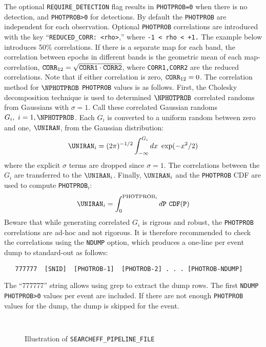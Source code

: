 \documentclass[12pt]{article}
\newcommand{\obs}{observation}
\begin{document}
{The optional {\tt REQUIRE\_DETECTION} flag results in {\tt PHOTPROB=0}
when there is no detection, and {\tt PHOTPROB>0} for detections.
By default the {\tt PHOTPROB} are independent for each \obs.
Optional {\tt PHOTPROB} correlations are introduced with the key
``{\tt REDUCED\_CORR: <rho>},'' where {\tt -1~<~rho~<~+1.}
The example below introduces 50\% correlations.
If there is a separate map for each band, the correlation
between epochs in different bands is the geometric mean of each
map-correlation, 
${\tt CORR}_{12} =\sqrt{{\tt CORR1}\cdot{\tt CORR2}}$, 
where {\tt CORR1,CORR2} are the reduced correlations.
Note that if either correlation is zero, ${\tt CORR}_{12}=0$.
The correlation method for $\NPHOTPROB$ {\tt PHOTPROB} 
values is as follows. 
First, the Cholesky decomposition technique is used to determined
$\NPHOTPROB$ correlated randoms from Gaussians with $\sigma=1$.
Call these correlated Gaussian randoms $G_i,~i=1,\NPHOTPROB$.
Each $G_i$ is converted to a uniform random between
zero and one, $\UNIRAN$, from the Gaussian distribution:
\begin{equation}
  \UNIRAN_i = (2\pi)^{-1/2} \int_{-\infty}^{G_i} dx~\exp(-x^2/2)
\end{equation}
where the explicit $\sigma$ terms are dropped since $\sigma=1$.
The correlations between the $G_i$ are transferred to the $\UNIRAN_i$.
Finally, $\UNIRAN_i$ and the {\tt PHOTPROB} CDF are used
to compute {\tt PHOTPROB}$_i$:
\begin{equation}
   \UNIRAN_i = \int_0^{{\tt\rm PHOTPROB}_i} d{\tt P}~{\tt CDF(P)}
\end{equation}
%
Beware that while generating correlated $G_i$ is rigrous and robust,
the {\tt PHOTPROB} correlations are ad-hoc and not rigorous.
It is therefore recommended to check the correlations using the
{\tt NDUMP} option,
which produces a one-line per event dump to standard-out as follows:
\begin{verbatim}
   777777  [SNID]  [PHOTROB-1]  [PHOTROB-2] . . . [PHOTROB-NDUMP]
\end{verbatim}
%
The ``777777'' string allows using grep to extract the dump rows.
The first {\tt NDUMP} {\tt PHOTPROB>0} values per event are included.
If there are not enough {\tt PHOTPROB} values for the dump, 
the dump is skipped for the event. 

\begin{figure}[hb] 
\begin{center}
\caption{Illustration of {\tt SEARCHEFF\_PIPELINE\_FILE} }
\label{fig:pipeline_maps}
\begin{Verbatim}[frame=single]


\end{Verbatim}
\end{center}
\end{figure}}
\end{document}
